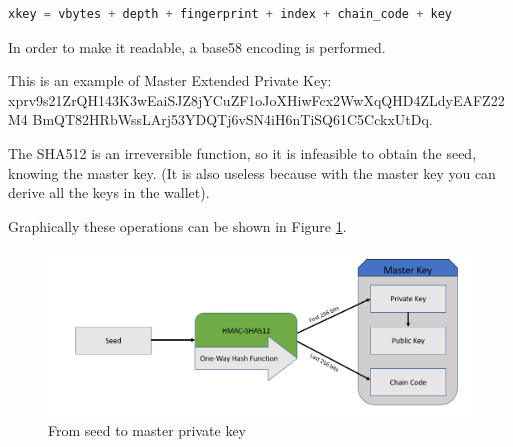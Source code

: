 \begin{lstlisting}[language=Python]
xkey = vbytes + depth + fingerprint + index + chain_code + key
\end{lstlisting}
\begin{flushleft}
	In order to make it readable, a base58 encoding is performed.
\end{flushleft}
This is an example of Master Extended Private Key: \\
xprv9s21ZrQH143K3wEaiSJZ8jYCuZF1oJoXHiwFcx2WwXqQHD4ZLdyEAFZ22M4 BmQT82HRbWssLArj53YDQTj6vSN4iH6nTiSQ61C5CckxUtDq.

\begin{remark}
	The SHA512 is an irreversible function, so it is infeasible to obtain the seed, knowing the master key. (It is also useless because with the master key you can derive all the keys in the wallet).
\end{remark}

\begin{flushleft}
	Graphically these operations can be shown in Figure \ref{fig:From seed to master private key}.
\end{flushleft}

\begin{figure}[ht!]
	\centering
	\includegraphics[width=14.5cm]{Figures/seed_to_xprv_v2.png}
	\caption{From seed to master private key}
	\label{fig:From seed to master private key}
\end{figure}


